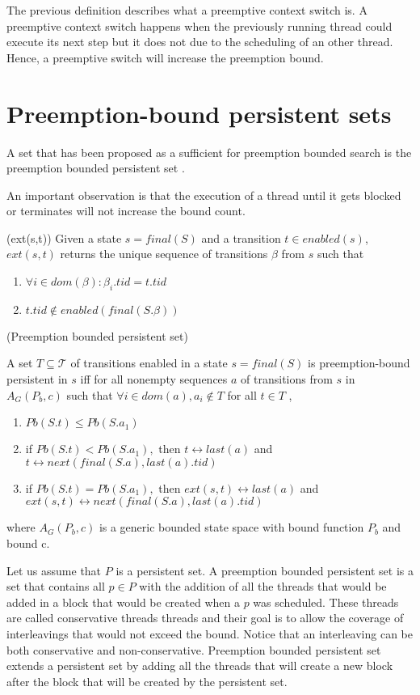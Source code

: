 The previous definition describes what a preemptive context switch is. A preemptive context switch happens when the previously running thread could execute
its next step but it does not due to the scheduling of an other thread. Hence, a preemptive switch will increase the preemption bound.

\section{Preemption-bound persistent sets}

A set that has been proposed as a sufficient for preemption bounded search is the preemption bounded persistent set \cite{BPOR}.

An important observation is that the execution of a thread until it gets blocked or terminates will not increase
the bound count.
\begin{definition}{(ext(s,t))}
    Given a state $s = final(S)$ and a transition $t \in enabled(s)$,
    $ext(s,t)$ returns the unique sequence of transitions $\beta$ from $s$
    such that
    \begin{enumerate}
        \item $\forall i \in dom(\beta): \beta_i.tid = t.tid$
        \item $t.tid \notin enabled(final(S.\beta))$
    \end{enumerate}
\end{definition}

\begin{definition}{(Preemption bounded persistent set)}

A set $T \subseteq \mathcal{T}$ of transitions enabled in a state $s=final(S)$
is preemption-bound persistent in $s$ iff for all nonempty
sequences $a$ of transitions from $s$ in $A_G(P_b,c)$ such that
$\forall i \in dom(a), a_i \notin T$ for all $t \in T$ ,

\begin{enumerate}
\item $Pb(S.t) \leq Pb(S.a_1)$
\item if $Pb(S.t) < Pb(S.a_{1}) ,$ then $t \leftrightarrow last(a)$ and $t \leftrightarrow  next(final(S.a), last(a).tid)$
\item if $Pb(S.t) = Pb(S.a_{1}),$ then $ext(s,t) \leftrightarrow last(a)$ and $ext(s,t) \leftrightarrow next(final(S.a), last(a).tid)$
\end{enumerate}

\end{definition}
where $A_G(P_b,c)$ is a generic bounded state space with bound function $P_b$ and bound c.

Let us assume that $P$ is a persistent set. A preemption bounded persistent set is a set that contains all $p \in P$ with the addition of all the 
threads that would be added in a block that would be created when a $p$ was scheduled. These threads are called conservative threads threads and their 
goal is to allow the coverage of interleavings that would not exceed the bound. Notice that an interleaving can be both conservative and non-conservative.
Preemption bounded persistent set extends a persistent set by adding all the threads that will create a new block
after the block that will be created by the persistent set.

